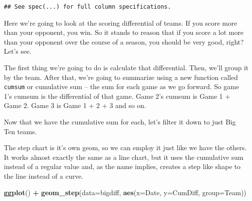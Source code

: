 \documentclass[]{book}
\newenvironment{Shaded}{\begin{snugshade}}{\end{snugshade}}
\newcommand{\DataTypeTok}[1]{\textcolor[rgb]{0.13,0.29,0.53}{#1}}
\newcommand{\KeywordTok}[1]{\textcolor[rgb]{0.13,0.29,0.53}{\textbf{#1}}}
\newcommand{\NormalTok}[1]{#1}
\newcommand{\OperatorTok}[1]{\textcolor[rgb]{0.81,0.36,0.00}{\textbf{#1}}}
\newcommand{\StringTok}[1]{\textcolor[rgb]{0.31,0.60,0.02}{#1}}
\begin{document}
\begin{verbatim}
## See spec(...) for full column specifications.
\end{verbatim}

Here we're going to look at the scoring differential of teams. If you score more than your opponent, you win. So it stands to reason that if you score a lot more than your opponent over the course of a season, you should be very good, right? Let's see.

The first thing we're going to do is calculate that differential. Then, we'll group it by the team. After that, we're going to summarize using a new function called \texttt{cumsum} or cumulative sum -- the sum for each game as we go forward. So game 1's cumsum is the differential of that game. Game 2's cumsum is Game 1 + Game 2. Game 3 is Game 1 + 2 + 3 and so on.

\begin{Shaded}
\end{Shaded}

Now that we have the cumulative sum for each, let's filter it down to just Big Ten teams.

\begin{Shaded}
\end{Shaded}

The step chart is it's own geom, so we can employ it just like we have the others. It works almost exactly the same as a line chart, but it uses the cumulative sum instead of a regular value and, as the name implies, creates a step like shape to the line instead of a curve.

\begin{Shaded}
\begin{Highlighting}[]
\KeywordTok{ggplot}\NormalTok{() }\OperatorTok{+}\StringTok{ }\KeywordTok{geom_step}\NormalTok{(}\DataTypeTok{data=}\NormalTok{bigdiff, }\KeywordTok{aes}\NormalTok{(}\DataTypeTok{x=}\NormalTok{Date, }\DataTypeTok{y=}\NormalTok{CumDiff, }\DataTypeTok{group=}\NormalTok{Team))}
\end{Highlighting}
\end{Shaded}
\end{document}
